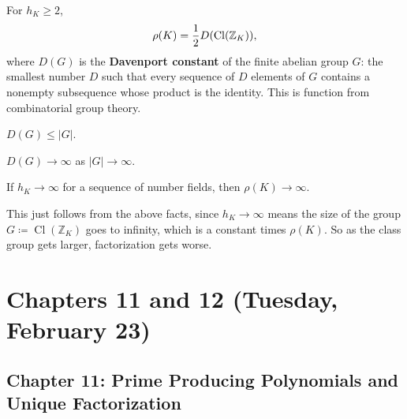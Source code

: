 \begin{theorem}[?]

For \(h_K \geq 2\),
\begin{align*}
\rho(K) = {1\over 2} D( \operatorname{Cl}( {\mathbb{Z}}_K))
,\end{align*}
where \(D(G)\) is the \textbf{Davenport constant} of the finite abelian
group \(G\): the smallest number \(D\) such that every sequence of \(D\)
elements of \(G\) contains a nonempty subsequence whose product is the
identity. This is function from combinatorial group theory.

\end{theorem}

\begin{exercise}[?]

\(D(G) \leq {\left\lvert {G} \right\rvert}\).

\end{exercise}

\begin{fact}

\(D(G) \to \infty\) as \({\left\lvert {G} \right\rvert} \to \infty\).

\end{fact}

\begin{corollary}[?]

If \(h_K \to \infty\) for a sequence of number fields, then
\(\rho(K) \to \infty\).

\end{corollary}

\begin{remark}

This just follows from the above facts, since \(h_K \to \infty\) means
the size of the group \(G \coloneqq\operatorname{Cl}( {\mathbb{Z}}_K)\)
goes to infinity, which is a constant times \(\rho(K)\). So as the class
group gets larger, factorization gets worse.

\end{remark}

\hypertarget{chapters-11-and-12-tuesday-february-23}{%
\section{Chapters 11 and 12 (Tuesday, February
23)}\label{chapters-11-and-12-tuesday-february-23}}

\hypertarget{chapter-11-prime-producing-polynomials-and-unique-factorization}{%
\subsection{Chapter 11: Prime Producing Polynomials and Unique
Factorization}\label{chapter-11-prime-producing-polynomials-and-unique-factorization}}


